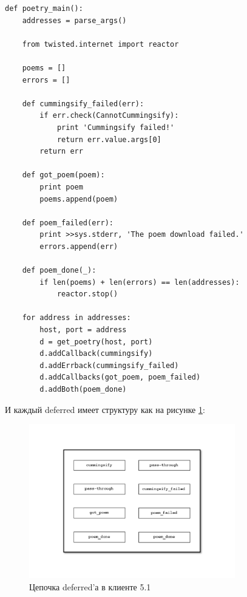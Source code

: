 \begin{scriptsize}\begin{verbatim}
def poetry_main():
    addresses = parse_args()

    from twisted.internet import reactor

    poems = []
    errors = []

    def cummingsify_failed(err):
        if err.check(CannotCummingsify):
            print 'Cummingsify failed!'
            return err.value.args[0]
        return err

    def got_poem(poem):
        print poem
        poems.append(poem)

    def poem_failed(err):
        print >>sys.stderr, 'The poem download failed.'
        errors.append(err)

    def poem_done(_):
        if len(poems) + len(errors) == len(addresses):
            reactor.stop()

    for address in addresses:
        host, port = address
        d = get_poetry(host, port)
        d.addCallback(cummingsify)
        d.addErrback(cummingsify_failed)
        d.addCallbacks(got_poem, poem_failed)
        d.addBoth(poem_done)
\end{verbatim}\end{scriptsize}

И каждый deferred имеет структуру как на рисунке \ref{fig:deferred-9}:
 
\begin{figure}[h]
\begin{center}
    \includegraphics[width=0.8\textwidth]{images/deferred-9.pdf}
    \caption{Цепочка deferred'а в клиенте 5.1\label{fig:deferred-9}}
\end{center}
\end{figure}

